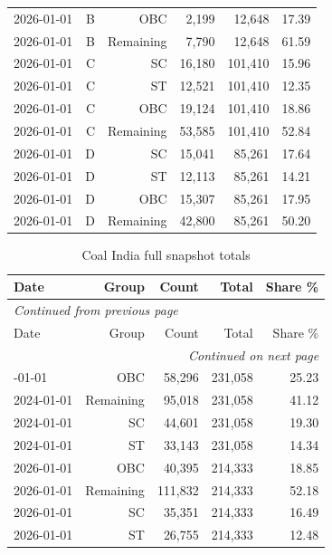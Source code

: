 \documentclass[11pt,a4paper]{report}
\begin{document}
\begin{longtable}{lrrrrr}
2026-01-01 & B & OBC & 2,199 & 12,648 & 17.39 \\
2026-01-01 & B & Remaining & 7,790 & 12,648 & 61.59 \\
2026-01-01 & C & SC & 16,180 & 101,410 & 15.96 \\
2026-01-01 & C & ST & 12,521 & 101,410 & 12.35 \\
2026-01-01 & C & OBC & 19,124 & 101,410 & 18.86 \\
2026-01-01 & C & Remaining & 53,585 & 101,410 & 52.84 \\
2026-01-01 & D & SC & 15,041 & 85,261 & 17.64 \\
2026-01-01 & D & ST & 12,113 & 85,261 & 14.21 \\
2026-01-01 & D & OBC & 15,307 & 85,261 & 17.95 \\
2026-01-01 & D & Remaining & 42,800 & 85,261 & 50.20 \\
\end{longtable}\endgroup
\begingroup\footnotesize\setlength{\tabcolsep}{4pt}
\begin{longtable}{lrrrr}
\caption{Coal India full snapshot totals}\\\toprule
Date & Group & Count & Total & Share \% \\\midrule\endfirsthead
\multicolumn{5}{l}{\textit{Continued from previous page}}\\\toprule
Date & Group & Count & Total & Share \% \\\midrule\endhead
\midrule\multicolumn{5}{r}{\textit{Continued on next page}}\\\endfoot\bottomrule\endlastfoot
2024-01-01 & OBC & 58,296 & 231,058 & 25.23 \\
2024-01-01 & Remaining & 95,018 & 231,058 & 41.12 \\
2024-01-01 & SC & 44,601 & 231,058 & 19.30 \\
2024-01-01 & ST & 33,143 & 231,058 & 14.34 \\
2026-01-01 & OBC & 40,395 & 214,333 & 18.85 \\
2026-01-01 & Remaining & 111,832 & 214,333 & 52.18 \\
2026-01-01 & SC & 35,351 & 214,333 & 16.49 \\
2026-01-01 & ST & 26,755 & 214,333 & 12.48 \\
\end{longtable}\endgroup
\begingroup\footnotesize\setlength{\tabcolsep}{4pt}
\end{document}
